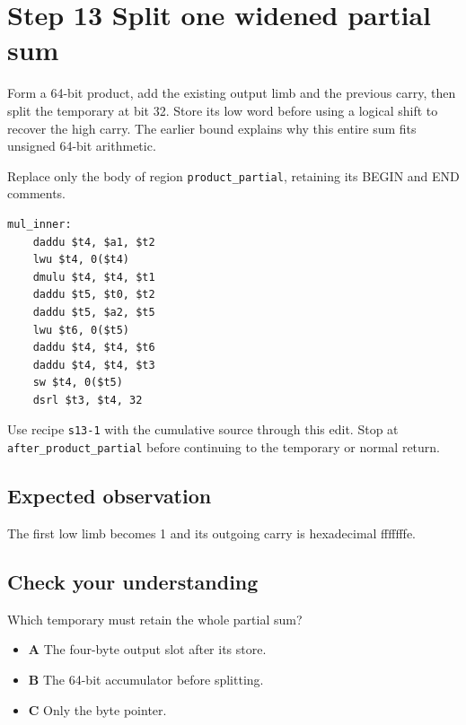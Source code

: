 \section{Step 13 Split one widened partial sum}\label{rsa-s13}

Form a 64-bit product, add the existing output limb and the previous carry, then split the temporary at bit 32. Store its low word before using a logical shift to recover the high carry. The earlier bound explains why this entire sum fits unsigned 64-bit arithmetic.

Replace only the body of region \texttt{product\_partial}, retaining its BEGIN and END comments.

\begin{verbatim}
mul_inner:
    daddu $t4, $a1, $t2
    lwu $t4, 0($t4)
    dmulu $t4, $t4, $t1
    daddu $t5, $t0, $t2
    daddu $t5, $a2, $t5
    lwu $t6, 0($t5)
    daddu $t4, $t4, $t6
    daddu $t4, $t4, $t3
    sw $t4, 0($t5)
    dsrl $t3, $t4, 32
\end{verbatim}

Use recipe \texttt{s13-1} with the cumulative source through this edit. Stop at \texttt{after\_product\_partial} before continuing to the temporary or normal return.

\subsection{Expected observation}
The first low limb becomes 1 and its outgoing carry is hexadecimal fffffffe.

\subsection{Check your understanding}
Which temporary must retain the whole partial sum?

\begin{itemize}
  \item \textbf{A} The four-byte output slot after its store.
  \item \textbf{B} The 64-bit accumulator before splitting.
  \item \textbf{C} Only the byte pointer.
\end{itemize}
